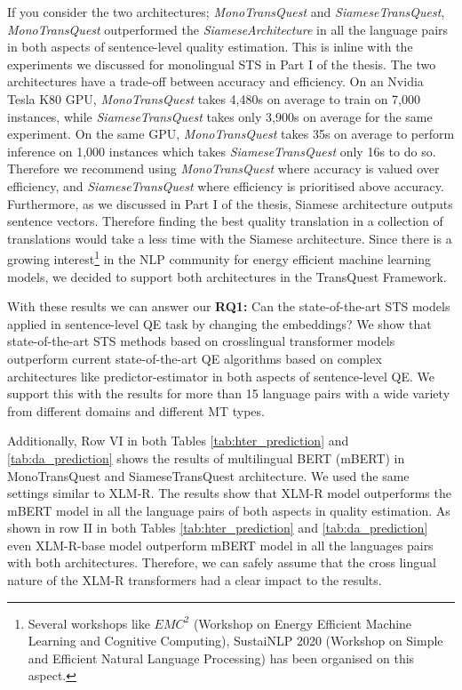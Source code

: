 If you consider the two architectures; \textit{MonoTransQuest} and \textit{SiameseTransQuest}, \textit{MonoTransQuest} outperformed the \textit{SiameseArchitecture} in all the language pairs in both aspects of sentence-level quality estimation. This is inline with the experiments we discussed for monolingual STS in Part I of the thesis. The two architectures have a trade-off between accuracy and efficiency. On an Nvidia Tesla K80 GPU, \textit{MonoTransQuest} takes 4,480s on average to train on 7,000 instances, while \textit{SiameseTransQuest} takes only 3,900s on average for the same experiment. On the same GPU, \textit{MonoTransQuest} takes 35s on average to perform inference on 1,000 instances which takes \textit{SiameseTransQuest} only 16s to do so. Therefore we recommend using \textit{MonoTransQuest} where accuracy is valued over efficiency, and \textit{SiameseTransQuest} where efficiency is prioritised above accuracy. Furthermore, as we discussed in Part I of the thesis, Siamese architecture outputs sentence vectors. Therefore finding the best quality translation in a collection of translations would take a less time with the Siamese architecture. Since there is a growing interest\footnote{Several workshops like $EMC^2$ (Workshop on Energy Efficient Machine Learning and Cognitive Computing), SustaiNLP 2020 (Workshop on Simple and Efficient Natural Language Processing) has been organised on this aspect.} in the NLP community for energy efficient machine learning models, we decided to support both architectures in the TransQuest Framework. 

With these results we can answer our \textbf{RQ1:} Can the state-of-the-art STS models applied in sentence-level QE task by changing the embeddings? We show that state-of-the-art STS methods based on crosslingual transformer models outperform current state-of-the-art QE algorithms based on complex architectures like predictor-estimator in both aspects of sentence-level QE. We support this with the results for more than 15 language pairs with a wide variety from different domains and different MT types.


Additionally, Row VI in both Tables \ref{tab:hter_prediction} and \ref{tab:da_prediction} shows the results of multilingual BERT (mBERT) in MonoTransQuest and SiameseTransQuest architecture. We used the same settings similar to XLM-R. The results show that XLM-R model outperforms the mBERT model in all the language pairs of both aspects in quality estimation. As shown in row II in both Tables \ref{tab:hter_prediction} and \ref{tab:da_prediction} even XLM-R-base model outperform mBERT model in all the languages pairs with both architectures. Therefore, we can safely assume that the cross lingual nature of the XLM-R transformers had a clear impact to the results.

